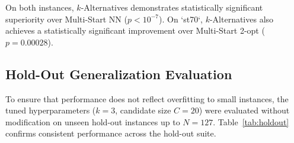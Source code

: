 \documentclass[11pt,a4paper]{article}
\begin{document}
\begin{table}[htbp]
\centering
\small
\caption{\textbf{Statistical Significance Tests with 95\% Confidence Intervals ($R=20$).}}
\label{tab:stats}
\end{table}

On both instances, $k$-Alternatives demonstrates statistically significant superiority over Multi-Start NN ($p < 10^{-7}$). On `st70`, $k$-Alternatives also achieves a statistically significant improvement over Multi-Start 2-opt ($p = 0.00028$).

\subsection{Hold-Out Generalization Evaluation}
To ensure that performance does not reflect overfitting to small instances, the tuned hyperparameters ($k=3$, candidate size $C=20$) were evaluated without modification on unseen hold-out instances up to $N=127$. Table~\ref{tab:holdout} confirms consistent performance across the hold-out suite.
\end{document}
